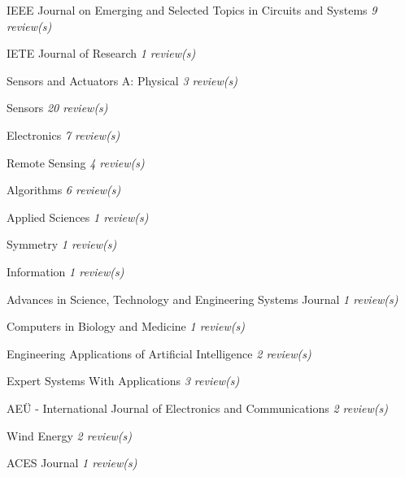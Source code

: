 {\begin{cvitems}
    \item {IEEE Journal on Emerging and Selected Topics in Circuits and Systems \hfill \bodyfontlight\slshape\color{awesome} 9 review(s)}
    \item {IETE Journal of Research \hfill \bodyfontlight\slshape\color{awesome} 1 review(s)}
    \item {Sensors and Actuators A: Physical \hfill \bodyfontlight\slshape\color{awesome} 3 review(s)}
    \item {Sensors \hfill \bodyfontlight\slshape\color{awesome} 20 review(s)}
    \item {Electronics \hfill \bodyfontlight\slshape\color{awesome} 7 review(s)}
    \item {Remote Sensing \hfill \bodyfontlight\slshape\color{awesome} 4 review(s)}
    \item {Algorithms \hfill \bodyfontlight\slshape\color{awesome} 6 review(s)}
    \item {Applied Sciences \hfill \bodyfontlight\slshape\color{awesome} 1 review(s)}
    \item {Symmetry \hfill \bodyfontlight\slshape\color{awesome} 1 review(s)}
    \item {Information \hfill \bodyfontlight\slshape\color{awesome} 1 review(s)}
    \item {Advances in Science, Technology and Engineering Systems Journal \hfill \bodyfontlight\slshape\color{awesome} 1 review(s)}
    \item {Computers in Biology and Medicine \hfill \bodyfontlight\slshape\color{awesome} 1 review(s)}
    \item {Engineering Applications of Artificial Intelligence \hfill \bodyfontlight\slshape\color{awesome} 2 review(s)}
    \item {Expert Systems With Applications \hfill \bodyfontlight\slshape\color{awesome} 3 review(s)}
    \item {AEÜ - International Journal of Electronics and Communications \hfill \bodyfontlight\slshape\color{awesome} 2 review(s)}
    \item {Wind Energy \hfill \bodyfontlight\slshape\color{awesome} 2 review(s)}
    \item {ACES Journal \hfill \bodyfontlight\slshape\color{awesome} 1 review(s)}
    
    \vspace{4.0mm}
\end{cvitems}
}


